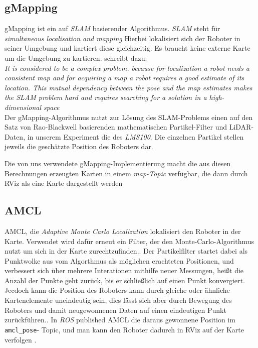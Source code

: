 \documentclass[11pt,a4paper]{article}
\begin{document}
\subsection*{gMapping}
gMapping ist ein auf \textit{SLAM} basierender Algorithmus. \textit{SLAM} steht für \textit{simultaneous localisation and mapping}\cite{website:mathworksSLAM}
Hierbei lokalisiert sich der Roboter in seiner Umgebung und kartiert diese gleichzeitig. Es braucht keine externe Karte um die Umgebung zu kartieren.
\cite{raoblackwellgmapping} schreibt dazu: \\
\textit{ It is
considered to be a complex problem, because for localization
a robot needs a consistent map and for acquiring a map a
robot requires a good estimate of its location. This mutual
dependency between the pose and the map estimates makes
the SLAM problem hard and requires searching for a solution
in a high-dimensional space} \\
Der gMapping-Algorithmus nutzt zur Lösung des SLAM-Problems einen auf den Satz von Rao-Blackwell basierenden mathematischen Partikel-Filter und LiDAR-Daten\cite{website:openslamgmapping},
in unserem Experiment die des \textit{LMS100}. Die einzelnen Partikel stellen jeweils die geschätzte Position des Roboters dar. 

Die von uns verwendete gMapping-Implementierung macht die aus diesen Berechnungen erzeugten Karten in einem \textit{map-Topic} verfügbar, die dann durch RViz als eine 
Karte dargestellt werden\cite{website:gmapping}

\subsection*{AMCL}
AMCL, die \textit{Adaptive Monte Carlo Localization} lokalisiert den Roboter in der Karte. Verwendet wird dafür erneut ein 
Filter, der den Monte-Carlo-Algorithmus nutzt um sich in der Karte zurechtzufinden.\cite{website:oreillyamcl}. 
Der Partikelfilter startet dabei als Punktwolke aus vom Algorthmus als möglichen erachteten Positionen, und verbessert sich über mehrere Interationen mithilfe neuer Messungen, 
heißt die Anzahl der Punkte geht zurück, bis er schließlich auf einen Punkt konvergiert. 
Jecdoch kann die Position des Roboters kann durch gleiche oder ähnliche Kartenelemente uneindeutig sein, dies lässt sich aber durch Bewegung des Roboters und 
damit neugewonnenen Daten auf einen eindeutigen Punkt zurückführen.\cite{fox1999monte}. In \textit{ROS} published AMCL die daraus gewonnene Position im \verb+amcl_pose+-
Topic, und man kann den Roboter dadurch in RViz auf der Karte verfolgen \cite{website:amcl}.
\end{document}
